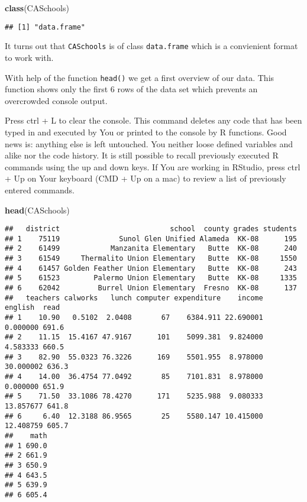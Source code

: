 \documentclass[]{book}
\newenvironment{Shaded}{\begin{snugshade}}{\end{snugshade}}
\newcommand{\KeywordTok}[1]{\textcolor[rgb]{0.13,0.29,0.53}{\textbf{#1}}}
\newcommand{\NormalTok}[1]{#1}
\theoremstyle{definition}
\theoremstyle{definition}
\theoremstyle{definition}
\theoremstyle{remark}
\let\BeginKnitrBlock\begin \let\EndKnitrBlock\end
\begin{document}
\begin{Shaded}
\begin{Highlighting}[]
\KeywordTok{class}\NormalTok{(CASchools)}
\end{Highlighting}
\end{Shaded}

\begin{verbatim}
## [1] "data.frame"
\end{verbatim}

It turns out that \texttt{CASchools} is of class \texttt{data.frame}
which is a convienient format to work with.

With help of the function \texttt{head()} we get a first overview of our
data. This function shows only the first 6 rows of the data set which
prevents an overcrowded console output.

\BeginKnitrBlock{rmdnote}
Press ctrl + L to clear the console. This command deletes any code that
has been typed in and executed by You or printed to the console by R
functions. Good news is: anything else is left untouched. You neither
loose defined variables and alike nor the code history. It is still
possible to recall previously executed R commands using the up and down
keys. If You are working in RStudio, press ctrl + Up on Your keyboard
(CMD + Up on a mac) to review a list of previously entered commands.
\EndKnitrBlock{rmdnote}

\begin{Shaded}
\begin{Highlighting}[]
\KeywordTok{head}\NormalTok{(CASchools)}
\end{Highlighting}
\end{Shaded}

\begin{verbatim}
##   district                          school  county grades students
## 1    75119              Sunol Glen Unified Alameda  KK-08      195
## 2    61499            Manzanita Elementary   Butte  KK-08      240
## 3    61549     Thermalito Union Elementary   Butte  KK-08     1550
## 4    61457 Golden Feather Union Elementary   Butte  KK-08      243
## 5    61523        Palermo Union Elementary   Butte  KK-08     1335
## 6    62042         Burrel Union Elementary  Fresno  KK-08      137
##   teachers calworks   lunch computer expenditure    income   english  read
## 1    10.90   0.5102  2.0408       67    6384.911 22.690001  0.000000 691.6
## 2    11.15  15.4167 47.9167      101    5099.381  9.824000  4.583333 660.5
## 3    82.90  55.0323 76.3226      169    5501.955  8.978000 30.000002 636.3
## 4    14.00  36.4754 77.0492       85    7101.831  8.978000  0.000000 651.9
## 5    71.50  33.1086 78.4270      171    5235.988  9.080333 13.857677 641.8
## 6     6.40  12.3188 86.9565       25    5580.147 10.415000 12.408759 605.7
##    math
## 1 690.0
## 2 661.9
## 3 650.9
## 4 643.5
## 5 639.9
## 6 605.4
\end{verbatim}
\end{document}
